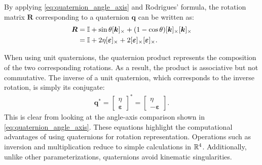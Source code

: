 By applying \autoref{eq:quaternion_angle_axis} and Rodrigues’ formula, the 
rotation matrix \(\bm{R}\) corresponding to a quaternion \(\bm{q}\) can be 
written as:
\begin{align}
    \bm{R} &= \mathbb{I} + \sin\theta [\bm{k}]_{\times} + (1-\cos\theta)[\bm{k}]_{\times}[\bm{k}]_{\times} \\
    &= \mathbb{I} + 2 \eta [\bm{\varepsilon}]_{\times} + 2 [\bm{\varepsilon}]_{\times} [\bm{\varepsilon}]_{\times}.
\end{align}

When using unit quaternions, the quaternion product represents the composition 
of the two corresponding rotations. As a result, the product is associative 
but not commutative. The inverse of a unit quaternion, which corresponds to the 
inverse rotation, is simply its conjugate:
\begin{align}
    \bm{q}^* = \begin{bmatrix}
        \eta \\
        \bm{\varepsilon}
    \end{bmatrix}^* = \begin{bmatrix}
        \eta \\
        -\bm{\varepsilon}
    \end{bmatrix}.
\end{align}
This is clear from looking at the angle-axis comparison shown in \autoref{eq:quaternion_angle_axis}.
These equations highlight the computational advantages of using quaternions 
for rotation representation. Operations such as inversion and multiplication 
reduce to simple calculations in \(\mathbb{R}^4\). Additionally, unlike other 
parameterizations, quaternions avoid kinematic singularities.

